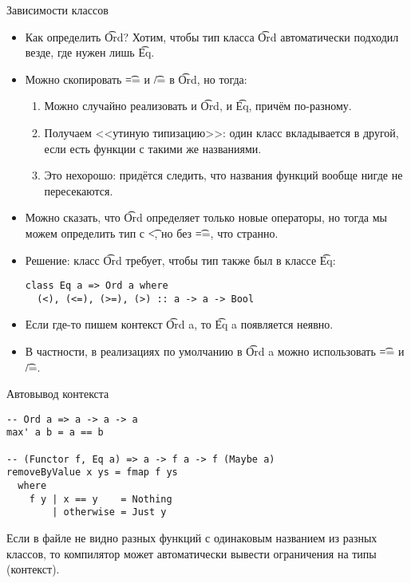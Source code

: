 \begin{frame}[fragile]{Зависимости классов}
	\begin{itemize}
		\item Как определить \t{Ord}? Хотим, чтобы тип класса \t{Ord} автоматически подходил везде, где нужен лишь \t{Eq}.
		\item Можно скопировать \t{==} и \t{/=} в \t{Ord}, но тогда:
			\begin{enumerate}
				\item Можно случайно реализовать и \t{Ord}, и \t{Eq}, причём по-разному.
				\item Получаем <<утиную типизацию>>: один класс вкладывается в другой, если есть функции с такими же названиями.
				\item Это нехорошо: придётся следить, что названия функций вообще нигде не пересекаются.
			\end{enumerate}
		\item Можно сказать, что \t{Ord} определяет только новые операторы, но тогда мы можем определить тип с \t{<}, но без \t{==}, что странно.
		\item Решение: класс \t{Ord} требует, чтобы тип также был в классе \t{Eq}:
\begin{verbatim}
class Eq a => Ord a where
  (<), (<=), (>=), (>) :: a -> a -> Bool
\end{verbatim}
		\item Если где-то пишем контекст \t{Ord a}, то \t{Eq a} появляется неявно.
		\item В частности, в реализациях по умолчанию в \t{Ord a} можно использовать \t{==} и \t{/=}.
	\end{itemize}
\end{frame}

\begin{frame}[fragile]{Автовывод контекста}
\begin{verbatim}
-- Ord a => a -> a -> a
max' a b = a == b

-- (Functor f, Eq a) => a -> f a -> f (Maybe a)
removeByValue x ys = fmap f ys
  where
    f y | x == y    = Nothing
        | otherwise = Just y
\end{verbatim}
	Если в файле не видно разных функций с одинаковым названием из разных классов, то компилятор может автоматически вывести ограничения на типы (контекст).
\end{frame}

